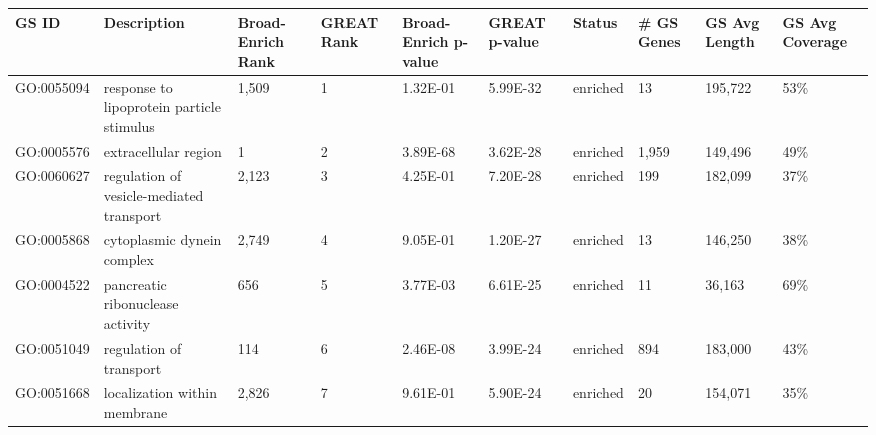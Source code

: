 \begin{sidewaystable}[!ht]
\tiny
\centering
\begin{tabular}{lp{2cm}p{1cm}p{1cm}p{1.25cm}p{1.25cm}p{1cm}p{1.25cm}p{1.25cm}p{1.25cm}}
\textbf{GS ID} & \textbf{Description}                                      & \textbf{Broad-Enrich Rank} & \textbf{GREAT Rank} & \textbf{Broad-Enrich p-value} & \textbf{GREAT p-value} & \textbf{Status} & \textbf{\# GS Genes} & \textbf{GS Avg Length} & \textbf{GS Avg Coverage} \\\hline
GO:0055094     & response to lipoprotein particle stimulus                 & 1,509                      & 1                   & 1.32E-01                      & 5.99E-32               & enriched        & 13                   & 195,722                & 53\%                     \\
GO:0005576     & extracellular region                                      & 1                          & 2                   & 3.89E-68                      & 3.62E-28               & enriched        & 1,959                & 149,496                & 49\%                     \\
GO:0060627     & regulation of vesicle-mediated transport                  & 2,123                      & 3                   & 4.25E-01                      & 7.20E-28               & enriched        & 199                  & 182,099                & 37\%                     \\
GO:0005868     & cytoplasmic dynein complex                                & 2,749                      & 4                   & 9.05E-01                      & 1.20E-27               & enriched        & 13                   & 146,250                & 38\%                     \\
GO:0004522     & pancreatic ribonuclease activity                          & 656                        & 5                   & 3.77E-03                      & 6.61E-25               & enriched        & 11                   & 36,163                 & 69\%                     \\
GO:0051049     & regulation of transport                                   & 114                        & 6                   & 2.46E-08                      & 3.99E-24               & enriched        & 894                  & 183,000                & 43\%                     \\
GO:0051668     & localization within membrane                              & 2,826                      & 7                   & 9.61E-01                      & 5.90E-24               & enriched        & 20                   & 154,071                & 35\%                     \\

\end{tabular}
\end{sidewaystable}
